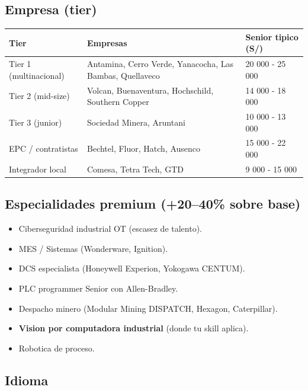 \documentclass[11pt,a4paper,oneside]{report}
\begin{document}
\subsection{Empresa (tier)}

\begin{center}
\begin{tabular}{lll}
\toprule
\textbf{Tier} & \textbf{Empresas} & \textbf{Senior tipico (S/)} \\
\midrule
Tier 1 (multinacional) & Antamina, Cerro Verde, Yanacocha, Las Bambas, Quellaveco & 20 000 - 25 000 \\
Tier 2 (mid-size)      & Volcan, Buenaventura, Hochschild, Southern Copper       & 14 000 - 18 000 \\
Tier 3 (junior)        & Sociedad Minera, Aruntani                                & 10 000 - 13 000 \\
EPC / contratistas     & Bechtel, Fluor, Hatch, Ausenco                          & 15 000 - 22 000 \\
Integrador local       & Comesa, Tetra Tech, GTD                                  &  9 000 - 15 000 \\
\bottomrule
\end{tabular}
\end{center}

\subsection{Especialidades premium (+20--40\% sobre base)}

\begin{itemize}[leftmargin=2em]
  \item Ciberseguridad industrial OT (escasez de talento).
  \item MES / Sistemas (Wonderware, Ignition).
  \item DCS especialista (Honeywell Experion, Yokogawa CENTUM).
  \item PLC programmer Senior con Allen-Bradley.
  \item Despacho minero (Modular Mining DISPATCH, Hexagon, Caterpillar).
  \item \textbf{Vision por computadora industrial} (donde tu skill aplica).
  \item Robotica de proceso.
\end{itemize}

\subsection{Idioma}
\end{document}
